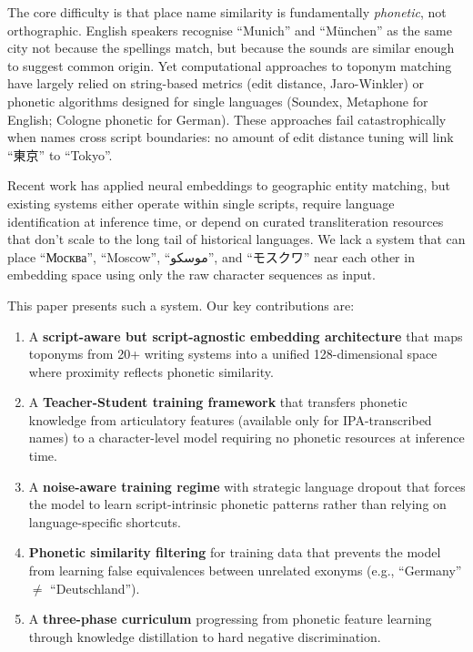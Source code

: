 \documentclass[11pt,a4paper]{article}
\newcommand{\embdim}{128}
\begin{document}
The core difficulty is that place name similarity is fundamentally \emph{phonetic}, not orthographic. English speakers recognise ``Munich'' and ``München'' as the same city not because the spellings match, but because the sounds are similar enough to suggest common origin. Yet computational approaches to toponym matching have largely relied on string-based metrics (edit distance, Jaro-Winkler) or phonetic algorithms designed for single languages (Soundex, Metaphone for English; Cologne phonetic for German). These approaches fail catastrophically when names cross script boundaries: no amount of edit distance tuning will link ``東京'' to ``Tokyo''.

Recent work has applied neural embeddings to geographic entity matching, but existing systems either operate within single scripts, require language identification at inference time, or depend on curated transliteration resources that don't scale to the long tail of historical languages. We lack a system that can place ``Москва'', ``Moscow'', ``موسکو'', and ``モスクワ'' near each other in embedding space using only the raw character sequences as input.

This paper presents such a system. Our key contributions are:

\begin{enumerate}
    \item A \textbf{script-aware but script-agnostic embedding architecture} that maps toponyms from 20+ writing systems into a unified \embdim-dimensional space where proximity reflects phonetic similarity.

    \item A \textbf{Teacher-Student training framework} that transfers phonetic knowledge from articulatory features (available only for IPA-transcribed names) to a character-level model requiring no phonetic resources at inference time.

    \item A \textbf{noise-aware training regime} with strategic language dropout that forces the model to learn script-intrinsic phonetic patterns rather than relying on language-specific shortcuts.

    \item \textbf{Phonetic similarity filtering} for training data that prevents the model from learning false equivalences between unrelated exonyms (e.g., ``Germany'' $\neq$ ``Deutschland'').

    \item A \textbf{three-phase curriculum} progressing from phonetic feature learning through knowledge distillation to hard negative discrimination.
\end{enumerate}
\end{document}

